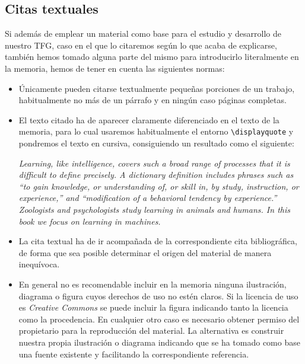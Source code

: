 \subsection{Citas textuales}

Si además de emplear un material como base para el estudio y desarrollo de nuestro TFG, caso en el que lo citaremos según lo que acaba de explicarse, también hemos tomado alguna parte del mismo para introducirlo literalmente en la memoria, hemos de tener en cuenta las siguientes normas:

\begin{itemize}
    \item Únicamente pueden citarse textualmente pequeñas porciones de un trabajo, habitualmente no más de un párrafo y en ningún caso páginas completas.

    \item El texto citado ha de aparecer claramente diferenciado en el texto de la memoria, para lo cual usaremos habitualmente el entorno \verb|\displayquote| y pondremos el texto en cursiva, consiguiendo un resultado como el siguiente:

          \begin{displayquote}
              \textit{Learning, like intelligence, covers such a broad range of processes that it is difficult to define precisely. A dictionary definition includes phrases such as “to gain knowledge, or understanding of, or skill in, by study, instruction, or experience,” and “modification of a behavioral tendency by experience.” Zoologists and psychologists study learning in animals and humans. In this book we focus on learning in machines.}
          \end{displayquote}

    \item La cita textual ha de ir acompañada de la correspondiente cita bibliográfica, de forma que sea posible determinar el origen del material de manera inequívoca.

    \item En general no es recomendable incluir en la memoria ninguna ilustración, diagrama o figura cuyos derechos de uso no estén claros. Si la licencia de uso es \textit{Creative Commons} se puede incluir la figura indicando tanto la licencia como la procedencia. En cualquier otro caso es necesario obtener permiso del propietario para la reproducción del material. La alternativa es construir nuestra propia ilustración o diagrama indicando que se ha tomado como base una fuente existente y facilitando la correspondiente referencia.
\end{itemize}

